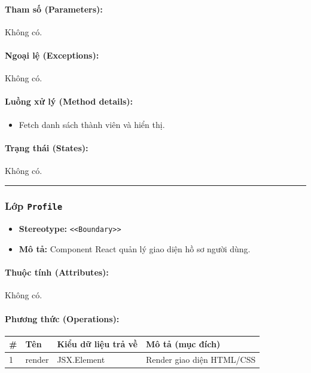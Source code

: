 \documentclass[12pt,a4paper]{article}
\begin{document}
\paragraph{Tham số (Parameters):}
Không có.

\paragraph{Ngoại lệ (Exceptions):}
Không có.

\paragraph{Luồng xử lý (Method details):}
\begin{itemize}[leftmargin=*]
    \item Fetch danh sách thành viên và hiển thị.
\end{itemize}


\paragraph{Trạng thái (States):}
Không có.

\vskip 0.5cm
\noindent\rule{\textwidth}{0.5pt}
\vskip 0.5cm

\subsubsection{Lớp \texttt{Profile}}

\begin{itemize}[leftmargin=*]
    \item \textbf{Stereotype:} \texttt{\textless{}\textless{}Boundary\textgreater{}\textgreater{}}
    \item \textbf{Mô tả:} Component React quản lý giao diện hồ sơ người dùng.
\end{itemize}

\paragraph{Thuộc tính (Attributes):}
Không có.

\paragraph{Phương thức (Operations):}
\begin{longtable}{|p{0.6cm}|p{5.0cm}|p{2.8cm}|p{5.4cm}|}
\hline
\textbf{\#} & \textbf{Tên} & \textbf{Kiểu dữ liệu trả về} & \textbf{Mô tả (mục đích)} \\ \hline
\endhead
1 & render & JSX.Element & Render giao diện HTML/CSS \\ \hline
\end{longtable}
\end{document}
